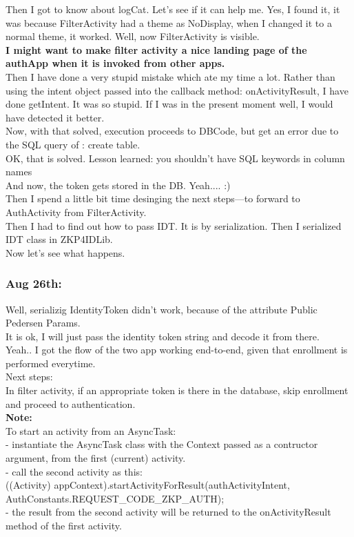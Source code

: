 \documentclass[11pt]{article}
\begin{document}
Then I got to know about logCat. Let's see if it can help me. Yes, I found it, it was because FilterActivity had a theme as NoDisplay, when I changed 
it to a normal theme, it worked. Well, now FilterActivity is visible. \\
\textbf{I might want to make filter activity a nice landing page of the authApp when it is invoked from other apps.}\\

Then I have done a very stupid mistake which ate my time a lot. Rather than using the intent object passed into the callback method: 
onActivityResult, I have done getIntent. It was so stupid. If I was in the present moment well, I would have detected it better.\\

Now, with that solved, execution proceeds to DBCode, but get an error due to the SQL query of : create table.\\
OK, that is solved. Lesson learned: you shouldn't have SQL keywords in column names\\

And now, the token gets stored in the DB. Yeah.... :)\\

Then I spend a little bit time desinging the next steps---to forward to AuthActivity from FilterActivity.\\
Then I had to find out how to pass IDT. It is by serialization. Then I serialized IDT class in ZKP4IDLib.\\
Now let's see what happens.\\

\subsubsection*{Aug 26th:}
Well, serializig IdentityToken didn't work, because of the attribute Public Pedersen Params.\\
It is ok, I will just pass the identity token string and decode it from there.\\

Yeah.. I got the flow of the two app working end-to-end, given that enrollment is performed everytime.\\
Next steps:\\
In filter activity, if an appropriate token is there in the database, skip enrollment and proceed to authentication. \\

\textbf{Note:}\\
To start an activity from an AsyncTask:\\
- instantiate the AsyncTask class with the Context passed as a contructor argument, from the first (current) activity.\\
- call the second activity as this:\\
((Activity) appContext).startActivityForResult(authActivityIntent, AuthConstants.REQUEST\_CODE\_ZKP\_AUTH);\\
- the result from the second activity will be returned to the onActivityResult method of the first activity.\\
\end{document}
